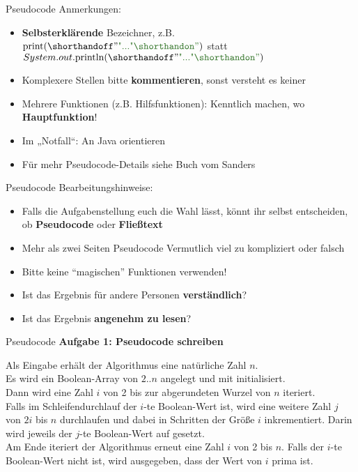 \begin{frame}{Pseudocode}
	Anmerkungen: \\
	\begin{itemize}
		\pause
		\item \textbf{Selbsterklärende} Bezeichner, z.B. $\|print|(\str{...})$ statt $System.out.\|println|(\str{...})$
		\pause
		\item Komplexere Stellen bitte \textbf{kommentieren}, sonst versteht es keiner
		\pause
		\item Mehrere Funktionen (z.B. Hilfsfunktionen): Kenntlich machen, wo \textbf{Hauptfunktion}!
		\pause
		\item Im „Notfall“: An Java orientieren
		\pause
		\item Für mehr Pseudocode-Details siehe Buch vom Sanders
	\end{itemize}
\end{frame}


\begin{frame}{Pseudocode}
	Bearbeitungshinweise: \\
	\begin{itemize}[<+->]
		\item Falls die Aufgabenstellung euch die Wahl lässt, könnt ihr selbst entscheiden, ob \textbf{Pseudocode} oder \textbf{Fließtext}
		\item Mehr als zwei Seiten Pseudocode \impl Vermutlich viel zu kompliziert oder falsch
		\item Bitte keine \enquote{magischen} Funktionen verwenden!
		\item Ist das Ergebnis für andere Personen \textbf{verständlich}?
		\item Ist das Ergebnis \textbf{angenehm zu lesen}?
	\end{itemize}
\end{frame}


\begin{frame}{Pseudocode}
	\textbf{Aufgabe 1: Pseudocode schreiben} \\
	\medskip
	
	Als Eingabe erhält der Algorithmus eine natürliche Zahl $n$.\\ 
	Es wird ein  Boolean-Array von $2..n$ angelegt und mit \KwFalse initialisiert.\\ 
	\smallskip
	Dann wird eine Zahl $i$ von 2 bis zur abgerundeten Wurzel von $n$ iteriert.\\
	Falls im Schleifendurchlauf der $i$-te Boolean-Wert \KwFalse ist, wird eine weitere Zahl $j$ von $2i$ bis $n$ durchlaufen und dabei in Schritten der Größe $i$ inkrementiert. Darin wird jeweils der $j$-te Boolean-Wert auf \KwTrue gesetzt. \\
	\smallskip
	Am Ende iteriert der Algorithmus erneut eine Zahl $i$ von 2 bis $n$. Falls der $i$-te Boolean-Wert nicht \KwTrue ist, wird ausgegeben, dass der Wert von $i$ prima ist.
\end{frame}

